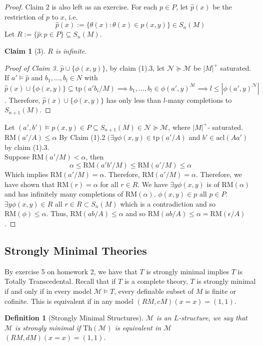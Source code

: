 \documentclass[letterpaper, 12pt]{article}
\newcommand{\cM}{\mathcal{M}}
\newcommand{\cN}{\mathcal{N}}
\newcommand{\Th}{\mbox{Th}}
\newcommand{\tp}{\mbox{tp}}
\newcommand{\RM}{\mbox{RM}}
\newcommand{\acl}{\mbox{acl}}
\theoremstyle{stdthm}
\theoremstyle{stddef}
\newtheorem{defn}[thm]{Definition}
\theoremstyle{stdnonum}
\newtheorem{claim}{Claim}
\theoremstyle{stdqands}
\theoremstyle{stdbold}
\begin{document}
\begin{proof}
Claim 2 is also left as an exercise. For each $p \in P$, let $\hat{p}(x)$ be the restriction of $p$ to $x$, i.e. 
\[ \hat{p}(x) := \{\theta(x): \theta(x) \in p(x,y)\} \in S_n(M) \] 
Let $R:= \{\hat{p}: p \in P\} \subseteq S_n(M)$. 

\begin{claim}[3]
$R$ is infinite. 
\end{claim}

\begin{proof}[Proof of Claim 3]
$\hat{p}\cup \{\phi(x,y)\}$, by claim (1).3, let $\cN \succeq \cM$ be $|M|^+$ saturated. If $a' \models \hat{p}$  and  $b_1,\dots, b_l \in N$ with $\hat{p}(x) \cup \{\phi(x,y)\} \subseteq \tp(a'b_i/M) \implies b_1,\dots,b_l \in \phi(a',y)^\cM \implies l \leq |\phi(a',y)^\cN|$. Therefore, $\hat{p}(x) \cup \{\phi(x,y)\}$ has only less than $l$-many completions to $S_{n+1}(M)$. 
\end{proof}

Let $(a',b') \models p(x,y) \in P\subseteq S_{n+1}(M) \in \cN \succeq \cM$, where $|M|^+$- saturated.  $\RM(a'/A) \leq \alpha$ By Claim (1).2 $(\exists y \phi(x,y) \in \tp(a'/A)$ and $b' \in \acl(Aa')$ by claim (1).3.\\

Suppose $\RM(a'/M) < \alpha$, then 
\[ \alpha \leq \RM(a'b'/M) \leq \RM(a'/M) \leq \alpha \] 
Which implies $\RM(a'/M) = \alpha$. Therefore, $\RM(a'/M) = \alpha$. Therefore, we have shown that $\RM(r) = \alpha$ for all $r \in R$. We have $\exists y \phi(x,y)$ is of $\RM(\alpha)$ and has infinitely many completions of $\RM(\alpha)$. $\phi(x,y) \in p$ all $p \in P$. $\exists y \phi(x,y) \in R$ all $r \in R \subset S_n(M)$ which is a contradiction and so $\RM(\phi) \leq \alpha$. Thus, $\RM(ab/A) \leq \alpha$ and so $\RM(ab/A) \leq \alpha = \RM(\epsilon/A)$. 
\end{proof}

\subsection{Strongly Minimal Theories}
By exercise 5 on homework 2, we have that $T$ is strongly minimal implies $T$ is Totally Transcedental. Recall that if $T$ is a complete theory, $T$ is strongly minimal if and only if in every model $\cM \models T$, every definable subset of $M$ is finite or cofinite. This is equivalent if in any model $(RM,cM)(x=x) = (1,1)$. 

\begin{defn}[Strongly Minimal Structures]
 $\cM$ is an $L$-structure, we say that $\cM$ is strongly minimal if $\Th(\cM)$ is equivalent in $\cM$ $(RM,dM)(x=x) = (1,1)$. 
\end{defn}
\end{document}
